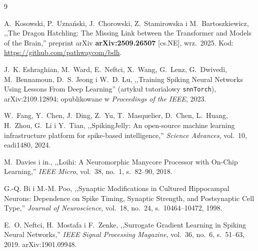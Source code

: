 \documentclass[11pt]{article}
\begin{document}
\begin{thebibliography}{9}

A.~Kosowski, P.~Uznański, J.~Chorowski, Z.~Stamirowska i M.~Bartoszkiewicz,
,,The Dragon Hatchling: The Missing Link between the Transformer and Models
of the Brain,'' preprint arXiv \textbf{arXiv:2509.26507} [cs.NE], wrz.~2025.
Kod: \url{https://github.com/pathwaycom/bdh}.

J.~K. Eshraghian, M.~Ward, E.~Neftci, X.~Wang, G.~Lenz, G.~Dwivedi,
M.~Bennamoun, D.~S. Jeong i W.~D. Lu,
,,Training Spiking Neural Networks Using Lessons From Deep Learning''
(artykuł tutorialowy \texttt{snnTorch}),
arXiv:2109.12894; opublikowane w \emph{Proceedings of the IEEE}, 2023.

W.~Fang, Y.~Chen, J.~Ding, Z.~Yu, T.~Masquelier, D.~Chen, L.~Huang,
H.~Zhou, G.~Li i Y.~Tian,
,,SpikingJelly: An open-source machine learning infrastructure platform for
spike-based intelligence,'' \emph{Science Advances}, vol.~10, eadi1480, 2024.

M.~Davies i in.,
,,Loihi: A Neuromorphic Manycore Processor with On-Chip Learning,''
\emph{IEEE Micro}, vol.~38, no.~1, s.~82--90, 2018.

G.-Q. Bi i M.-M. Poo,
,,Synaptic Modifications in Cultured Hippocampal Neurons: Dependence on Spike
Timing, Synaptic Strength, and Postsynaptic Cell Type,''
\emph{Journal of Neuroscience}, vol.~18, no.~24, s.~10464--10472, 1998.

E.~O. Neftci, H.~Mostafa i F.~Zenke,
,,Surrogate Gradient Learning in Spiking Neural Networks,''
\emph{IEEE Signal Processing Magazine}, vol.~36, no.~6, s.~51--63, 2019.
arXiv:1901.09948.

\end{thebibliography}
\end{document}

